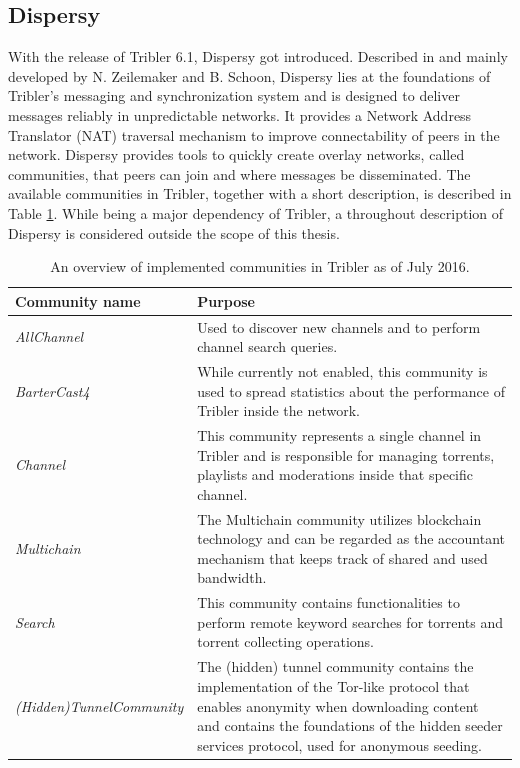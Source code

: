 \subsection{Dispersy}
With the release of Tribler 6.1, Dispersy got introduced. Described in \cite{zeilemaker2013dispersy} and mainly developed by N. Zeilemaker and B. Schoon, Dispersy lies at the foundations of Tribler's messaging and synchronization system and is designed to deliver messages reliably in unpredictable networks. It provides a Network Address Translator (NAT) traversal mechanism to improve connectability of peers in the network. Dispersy provides tools to quickly create overlay networks, called communities, that peers can join and where messages be disseminated. The available communities in Tribler, together with a short description, is described in Table \ref{table:dispersy-communities}. While being a major dependency of Tribler, a throughout description of Dispersy is considered outside the scope of this thesis.

\begin{table}
	\begin{tabularx}{\textwidth}{|l|X|}
		\hline
		\textbf{Community name} & \textbf{Purpose} \\ \hline
		\emph{AllChannel} & Used to discover new channels and to perform channel search queries.\\ \hline
		\emph{BarterCast4} & While currently not enabled, this community is used to spread statistics about the performance of Tribler inside the network.\\ \hline
		\emph{Channel} & This community represents a single channel in Tribler and is responsible for managing torrents, playlists and moderations inside that specific channel.\\ \hline
		\emph{Multichain} & The Multichain community utilizes blockchain technology and can be regarded as the accountant mechanism that keeps track of shared and used bandwidth.\\ \hline
		\emph{Search} & This community contains functionalities to perform remote keyword searches for torrents and torrent collecting operations.\\ \hline
		\emph{(Hidden)TunnelCommunity} & The (hidden) tunnel community contains the implementation of the Tor-like protocol that enables anonymity when downloading content and contains the foundations of the hidden seeder services protocol, used for anonymous seeding.\\ \hline
	\end{tabularx}
	\caption{An overview of implemented communities in Tribler as of July 2016.}
	\label{table:dispersy-communities}
\end{table}

